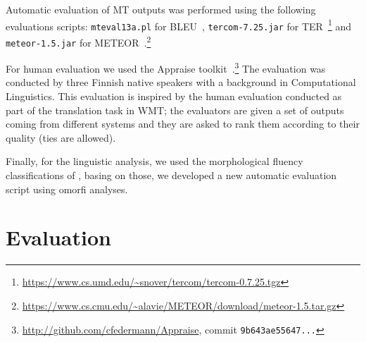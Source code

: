\documentclass[free]{flammie}
\begin{document}
Automatic evaluation of MT outputs was performed using the following evaluations scripts: \texttt{mteval13a.pl} for BLEU~\cite{papineni2002bleu}, \texttt{tercom-7.25.jar} for TER~\cite{ter}\footnote{\url{https://www.cs.umd.edu/~snover/tercom/tercom-0.7.25.tgz}} and  \texttt{meteor-1.5.jar} for METEOR~\cite{meteor}.\footnote{\url{https://www.cs.cmu.edu/~alavie/METEOR/download/meteor-1.5.tar.gz}}

For human evaluation we used the Appraise toolkit~\cite{appraise}.\footnote{\url{http://github.com/cfedermann/Appraise}, commit \texttt{9b643ae55647...}}
The evaluation was conducted by three Finnish native speakers with a background in Computational Linguistics.
This evaluation is inspired by the human evaluation conducted as part of the translation task in WMT;
the evaluators are given a set of outputs coming from different systems and they are asked to rank them according to their quality (ties are allowed).

Finally, for the linguistic analysis, we used the morphological fluency classifications of \cite{clifton2011combining}, basing on those,  we developed a new automatic evaluation script using omorfi analyses.

\section{Evaluation}
\label{sec:evaluation}

\end{document}
